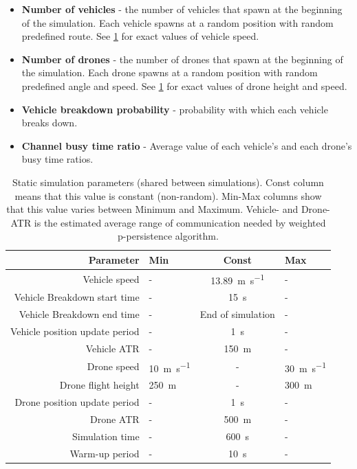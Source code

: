 \documentclass[]{nsm-thesis}
\begin{document}
\begin{itemize}

	\item \textbf{Number of vehicles} - the number of vehicles that spawn at the beginning of the simulation. Each vehicle spawns at a random position with random predefined route. See \cref{tab:simulationparams} for exact values of vehicle speed.
	
	\item \textbf{Number of drones} - the number of drones that spawn at the beginning of the simulation. Each drone spawns at a random position with random predefined angle and speed. See \cref{tab:simulationparams} for exact values of drone height and speed.
	
	\item \textbf{Vehicle breakdown probability} - probability with which each vehicle breaks down.

	\item \textbf{Channel busy time ratio} - Average value of each vehicle's and each drone's busy time ratios.
\end{itemize}


\begin{table}
    \centering
    \begin{tabular}{rlcl}
        \toprule
        Parameter & Min & Const & Max \\
        \midrule
		Vehicle speed & - & \SI{13.89}{\meter\per\second} & - \\
		Vehicle Breakdown start time & - & \SI{15}{\second} & - \\
		Vehicle Breakdown end time & - & End of simulation & - \\
		Vehicle position update period & - & \SI{1}{\second} & - \\
		Vehicle \ac{ATR} & - & \SI{150}{\meter} & - \\

        	Drone speed & \SI{10}{\meter\per\second} & - & \SI{30}{\meter\per\second} \\
        	Drone flight height & \SI{250}{\meter} & - & \SI{300}{\meter} \\
		Drone position update period & - & \SI{1}{\second} & - \\
		Drone \ac{ATR} & - & \SI{500}{\meter} & - \\

		Simulation time & - & \SI{600}{\second} & - \\
		Warm-up period & - & \SI{10}{\second} & - \\
		
        \bottomrule
    \end{tabular}
    \caption{Static simulation parameters (shared between simulations). Const column means that this value is constant (non-random). Min-Max columns show that this value varies between Minimum and Maximum. Vehicle- and Drone- \ac{ATR} is the estimated average range of communication needed by weighted p-persistence algorithm.}
    \label{tab:simulationparams}
\end{table}
\end{document}
